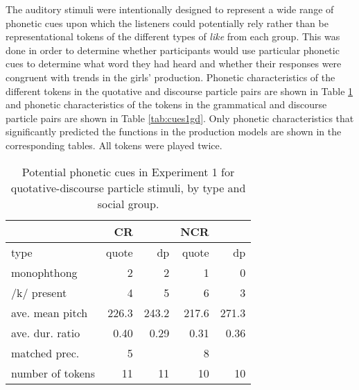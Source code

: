 The auditory stimuli were intentionally designed to represent a wide range of phonetic cues upon which the listeners could potentially rely rather than be representational tokens of the different types of \textit{like} from each group.  This was done in order to determine whether participants would use particular phonetic cues to determine what word they had heard and whether their responses were congruent with trends in the girls' production.  Phonetic characteristics of the different tokens in the quotative and discourse particle pairs are shown in Table \ref{tab:cues1qd} and phonetic characteristics of the tokens in the grammatical and discourse particle pairs are shown in Table \ref{tab:cues1gd}.  Only phonetic characteristics that significantly predicted the functions in the production models are shown in the corresponding tables.  All tokens were played twice.

\begin{table}[ht]
\begin{center}
\begin{tabular}{lrrrr}
  \hline
  
   
 	 						&	CR 		&			& NCR &   \\
  	 	  \hline
 type					&	 quote & dp 	\vline&   quote  & dp    \\
 monophthong 	&	 2     &  2 	\vline&   1  	  &  0    \\
 /k/ present 	&	 4     &  5  \vline&   6 	  &  3     \\
 ave. mean pitch &   226.3 &	243.2 \vline&  217.6	& 271.3  \\
 ave. dur. ratio &  0.40 &  0.29  \vline&  0.31 & 0.36 \\
 matched prec.   &   5   &    \vline&     8   &  \\
 number of tokens	&  11    & 11\vline&    10 	&  10   \\

   \hline
   
\end{tabular}
\caption{Potential phonetic cues in Ex\-peri\-ment 1 for quota\-tive-dis\-course par\-ticle stimuli, by type and social group.}\label{tab:cues1qd}
\end{center}
\end{table}	


